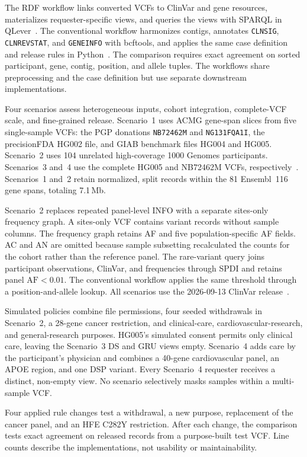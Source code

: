 \documentclass[11pt]{article}
\begin{document}
The RDF workflow links converted VCFs to ClinVar and gene resources, materializes requester-specific views, and queries the views with SPARQL in QLever~\cite{qlever_2017}.
The conventional workflow harmonizes contigs, annotates \texttt{CLNSIG}, \texttt{CLNREVSTAT}, and \texttt{GENEINFO} with bcftools, and applies the same case definition and release rules in Python~\cite{BCFtools}.
The comparison requires exact agreement on sorted participant, gene, contig, position, and allele tuples.
The workflows share preprocessing and the case definition but use separate downstream implementations.

Four scenarios assess heterogeneous inputs, cohort integration, complete-VCF scale, and fine-grained release.
Scenario~1 uses ACMG gene-span slices from five single-sample VCFs: the PGP donations \texttt{NB72462M} and \texttt{NG131FQA1I}, the precisionFDA HG002 file, and GIAB benchmark files HG004 and HG005.
Scenario~2 uses 104 unrelated high-coverage 1000 Genomes participants.
Scenarios~3 and~4 use the complete HG005 and NB72462M VCFs, respectively~\cite{personal_genome_proj,giab_v421_2022,byrska2022highcoverage}.
Scenarios~1 and~2 retain normalized, split records within the 81 Ensembl~116 gene spans, totaling 7.1\,Mb.

Scenario~2 replaces repeated panel-level INFO with a separate sites-only frequency graph.
A sites-only VCF contains variant records without sample columns.
The frequency graph retains AF and five population-specific AF fields.
AC and AN are omitted because sample subsetting recalculated the counts for the cohort rather than the reference panel.
The rare-variant query joins participant observations, ClinVar, and frequencies through SPDI and retains panel $\mathrm{AF}<0.01$.
The conventional workflow applies the same threshold through a position-and-allele lookup.
All scenarios use the 2026-09-13 ClinVar release~\cite{clinvar_vcf}.

Simulated policies combine file permissions, four seeded withdrawals in Scenario~2, a 28-gene cancer restriction, and clinical-care, cardiovascular-research, and general-research purposes.
HG005's simulated consent permits only clinical care, leaving the Scenario~3 DS and GRU views empty.
Scenario~4 adds care by the participant's physician and combines a 40-gene cardiovascular panel, an APOE region, and one DSP variant.
Every Scenario~4 requester receives a distinct, non-empty view.
No scenario selectively masks samples within a multi-sample VCF.

Four applied rule changes test a withdrawal, a new purpose, replacement of the cancer panel, and an HFE C282Y restriction.
After each change, the comparison tests exact agreement on released records from a purpose-built test VCF.
Line counts describe the implementations, not usability or maintainability.
\end{document}
